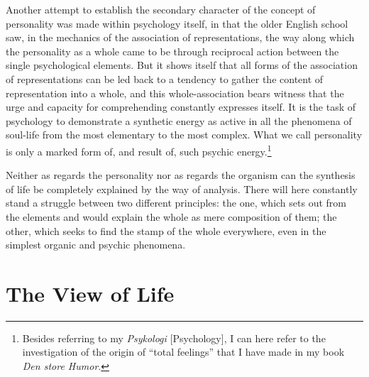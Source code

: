 \documentclass[12pt]{book}
\begin{document}
Another attempt to establish the secondary character of the concept of personality was made within
psychology itself, in that the older English school saw, in the mechanics of the association of
representations, the way along which the personality as a whole came to be through reciprocal action
between the single psychological elements. But it shows itself that all forms of the association of
representations can be led back to a tendency to gather the content of representation into a whole, and this
whole-association bears witness that the urge and capacity for comprehending constantly expresses itself.
It is the task of psychology to demonstrate a synthetic energy as active in all the phenomena of soul-life
from the most elementary to the most complex. What we call personality is only a marked form of, and result
of, such psychic energy.\footnote{Besides referring to my \textit{Psykologi} [Psychology], I can here refer
to the investigation of the origin of ``total feelings'' that I have made in my book \textit{Den store
Humor}.}

Neither as regards the personality nor as regards the organism can the synthesis of life be completely
explained by the way of analysis. There will here constantly stand a struggle between two different
principles: the one, which sets out from the elements and would explain the whole as mere composition of
them; the other, which seeks to find the stamp of the whole everywhere, even in the simplest organic and
psychic phenomena.

\chapter{The View of Life}
\label{ch:4}
\end{document}
